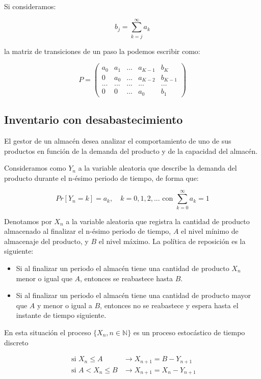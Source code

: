 \documentclass[
]{book}
\providecommand{\tightlist}{%
  \setlength{\itemsep}{0pt}\setlength{\parskip}{0pt}}
\theoremstyle{definition}
\theoremstyle{definition}
\theoremstyle{definition}
\theoremstyle{definition}
\theoremstyle{remark}
\begin{document}
Si consideramos:

\[b_j = \sum_{k=j}^{\infty} a_k\]

la matriz de transiciones de un paso la podemos escribir como:

\[P = 
\begin{pmatrix}
a_0 & a_1 & ... & a_{K-1} & b_K\\
0 & a_0 & ... & a_{K-2} & b_{K-1}\\
...&...&...&...&...\\
0 & 0 & ... & a_0 & b_1
\end{pmatrix}\]

\hypertarget{inventario2}{%
\subsection{Inventario con desabastecimiento}\label{inventario2}}

El gestor de un almacén desea analizar el comportamiento de uno de sus productos en función de la demanda del producto y de la capacidad del almacén.

Consideramos como \(Y_n\) a la variable aleatoria que describe la demanda del producto durante el n-ésimo periodo de tiempo, de forma que:

\[Pr[Y_n = k] = a_k, \quad k=0, 1, 2,...  \text{ con } \sum_{k=0}^{\infty} a_k =1\]

Denotamos por \(X_n\) a la variable aleatoria que registra la cantidad de producto almacenado al finalizar el n-ésimo periodo de tiempo, \(A\) el nivel mínimo de almacenaje del producto, y \(B\) el nivel máximo. La política de reposición es la siguiente:

\begin{itemize}
\tightlist
\item
  Si al finalizar un periodo el almacén tiene una cantidad de producto \(X_n\) menor o igual que \(A\), entonces se reabastece hasta \(B\).
\item
  Si al finalizar un periodo el almacén tiene una cantidad de producto mayor que \(A\) y menor o igual a \(B\), entonces no se reabastece y espera hasta el instante de tiempo siguiente.
\end{itemize}

En esta situación el proceso \(\{X_n, n \in \mathbb{N}\}\) es un proceso estocástico de tiempo discreto

\[\begin{array}{ll}
\text{ si } X_n \leq A & \rightarrow X_{n+1} = B - Y_{n+1} \\
\text{ si } A < X_n \leq B & \rightarrow X_{n+1} = X_n - Y_{n+1} 
\end{array}\]
\end{document}
